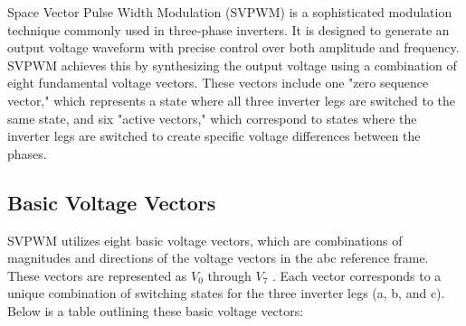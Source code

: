 Space Vector Pulse Width Modulation (SVPWM) is a sophisticated modulation
technique commonly used in three-phase inverters. It is designed to generate an
output voltage waveform with precise control over both amplitude and frequency.
SVPWM achieves this by synthesizing the output voltage using a combination of
eight fundamental voltage vectors. These vectors include one "zero sequence
vector," which represents a state where all three inverter legs are switched to
the same state, and six "active vectors," which correspond to states where the
inverter legs are switched to create specific voltage differences between the
phases.

\subsection{Basic Voltage Vectors}
SVPWM utilizes eight basic voltage vectors, which are combinations of
magnitudes and directions of the voltage vectors in the abc reference frame.
These vectors are represented as $V_0$ through $V_7$ . Each vector corresponds
to a unique combination of switching states for the three inverter legs (a, b,
and c). Below is a table outlining these basic voltage vectors:
